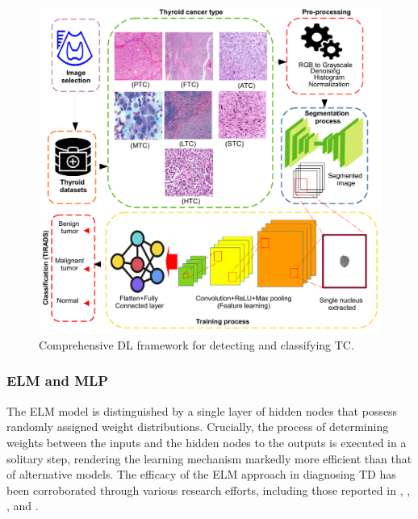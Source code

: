 \documentclass[a4paper,fleqn]{cas-sc}
\begin{document}
\begin{figure}[t!]
\centering
\includegraphics[scale=0.7]{fig4.pdf}
\caption{Comprehensive \ac{DL} framework for detecting and classifying TC.}
\label{fig4}
\end{figure}


\vskip2mm



\vskip2mm

\subsubsection{ELM and MLP}
The \ac{ELM} model is distinguished by a single layer of hidden nodes that possess randomly assigned weight distributions. Crucially, the process of determining weights between the inputs and the hidden nodes to the outputs is executed in a solitary step, rendering the learning mechanism markedly more efficient than that of alternative models. The efficacy of the \ac{ELM} approach in diagnosing \ac{TD} has been corroborated through various research efforts, including those reported in \cite{li2012computer}, \cite{ma2018efficient}, \cite{xia2017ultrasound}, and \cite{pavithra2021optimal}.
\end{document}
